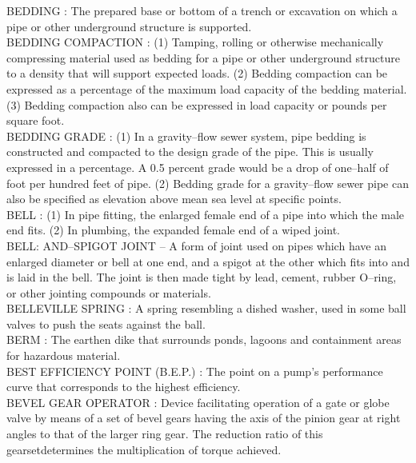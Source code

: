 \vspace{0.15cm}
BEDDING :  The prepared base or bottom of a trench or excavation on which a pipe or other underground structure is supported. \\
\vspace{0.15cm}
BEDDING COMPACTION :  (1) Tamping, rolling or otherwise mechanically compressing material used as bedding for a pipe or other underground structure to a density that will support expected loads. (2) Bedding compaction can be expressed as a percentage of the maximum load capacity of the bedding material. (3) Bedding compaction also can be expressed in load capacity or pounds per square foot. \\
\vspace{0.15cm}
BEDDING GRADE :  (1) In a gravity–flow sewer system, pipe bedding is constructed and compacted to the design grade of the pipe. This is usually expressed in a percentage. A 0.5 percent grade would be a drop of one–half of foot per hundred feet of pipe. (2) Bedding grade for a gravity–flow sewer pipe can also be specified as elevation above mean sea level at specific points. \\
\vspace{0.15cm}
BELL :  (1) In pipe fitting, the enlarged female end of a pipe into which the male end fits. (2) In plumbing, the expanded female end of a wiped joint. \\
\vspace{0.15cm}
BELL: AND–SPIGOT JOINT – A form of joint used on pipes which have an enlarged diameter or bell at one end, and a spigot at the other which fits into and is laid in the bell. The joint is then made tight by lead, cement, rubber O–ring, or other jointing compounds or materials. \\
\vspace{0.15cm}
BELLEVILLE SPRING :   A spring resembling a dished washer, used in some ball valves to push the seats against the ball.\\
\vspace{0.15cm}
BERM :  The earthen dike that surrounds ponds, lagoons and containment areas for hazardous material.\\
\vspace{0.15cm}
BEST EFFICIENCY POINT (B.E.P.) :   The point on a pump’s performance curve that corresponds to the highest efficiency.  \\
\vspace{0.15cm}
BEVEL GEAR OPERATOR :   Device facilitating operation of a gate or globe valve by means of a set of bevel gears having the axis of the pinion gear at right angles to that of the larger ring gear. The reduction ratio of this gearsetdetermines the multiplication of torque achieved.\\
